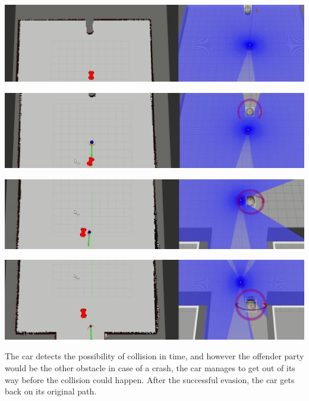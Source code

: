 \begin{minipage}{\textwidth}
    \includegraphics[width=\textwidth]{figures/raw/jpeg/local_planner_test_straight_traj_faster_obj_from_behind_1.jpg}

    \vspace{0.5cm}
    \includegraphics[width=\textwidth]{figures/raw/jpeg/local_planner_test_straight_traj_faster_obj_from_behind_2.jpg}

    \vspace{0.5cm}
    \includegraphics[width=\textwidth]{figures/raw/jpeg/local_planner_test_straight_traj_faster_obj_from_behind_3.jpg}

    \vspace{0.5cm}
    \includegraphics[width=\textwidth]{figures/raw/jpeg/local_planner_test_straight_traj_faster_obj_from_behind_4.jpg}

    \label{local_planner_test_straight_traj_faster_obj_from_behind}
\end{minipage}

The car detects the possibility of collision in time, and however the offender party would be the other obstacle in case of a crash, the car manages to get out of its way before the collision could happen. After the successful evasion, the car gets back on its original path.

